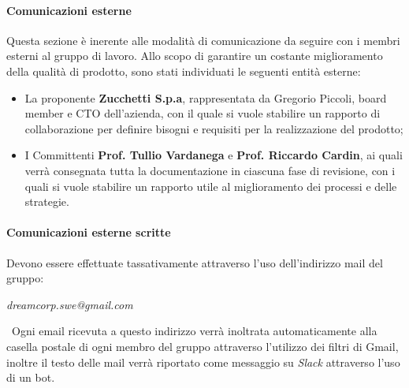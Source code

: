             \paragraph{Comunicazioni esterne}
                Questa sezione è inerente alle modalità di comunicazione da seguire con i membri esterni al gruppo di lavoro.
                \newline
                Allo scopo di garantire un costante miglioramento della qualità di prodotto, sono stati individuati le seguenti entità esterne:
                \begin{itemize}
                    \item La proponente \textbf{Zucchetti S.p.a}, rappresentata da Gregorio Piccoli, board member e CTO dell'azienda, con il quale si vuole stabilire un rapporto di collaborazione per definire bisogni e requisiti per la realizzazione del prodotto;
                    \item I Committenti \textbf{Prof. Tullio Vardanega} e \textbf{Prof. Riccardo Cardin}, ai quali verrà consegnata tutta la documentazione in ciascuna fase di revisione, con i quali si vuole stabilire un rapporto utile al miglioramento dei processi e delle strategie.
                \end{itemize}
                \paragraph{Comunicazioni esterne scritte} Devono essere effettuate tassativamente attraverso l'uso dell'indirizzo mail del gruppo:
                \newline
                \begin{center}
                	\textit{dreamcorp.swe@gmail.com}
                \end{center}
                
    ~\newline Ogni email ricevuta a questo indirizzo verrà inoltrata automaticamente alla casella postale di ogni membro del gruppo attraverso l'utilizzo dei filtri di Gmail\pedice, inoltre il testo delle mail verrà riportato come messaggio su \textit{Slack} attraverso l'uso di un bot.
